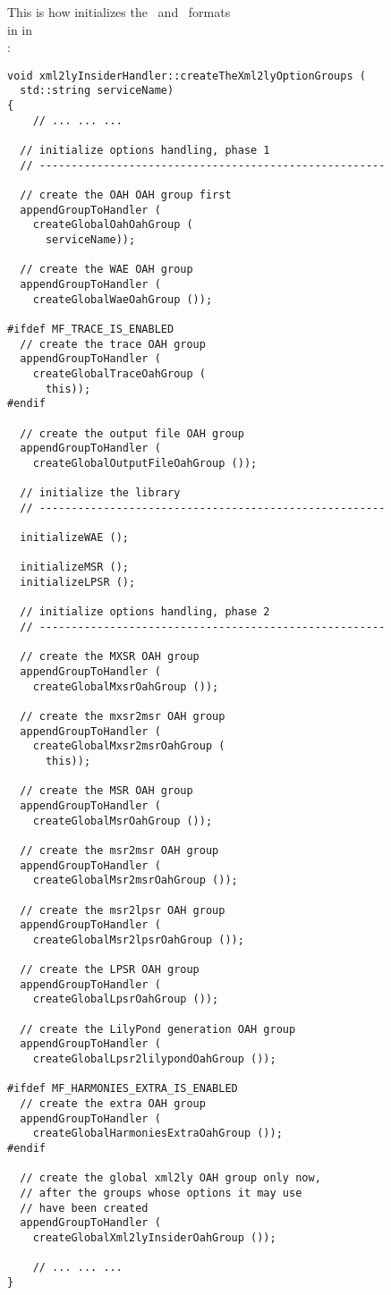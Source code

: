 This is how  initializes the \msrRepr\ and \lpsrRepr\ formats \\
in  in \\
:
\begin{lstlisting}[language=CPlusPlus]
void xml2lyInsiderHandler::createTheXml2lyOptionGroups (
  std::string serviceName)
{
	// ... ... ...

  // initialize options handling, phase 1
  // ------------------------------------------------------

  // create the OAH OAH group first
  appendGroupToHandler (
    createGlobalOahOahGroup (
      serviceName));

  // create the WAE OAH group
  appendGroupToHandler (
    createGlobalWaeOahGroup ());

#ifdef MF_TRACE_IS_ENABLED
  // create the trace OAH group
  appendGroupToHandler (
    createGlobalTraceOahGroup (
      this));
#endif

  // create the output file OAH group
  appendGroupToHandler (
    createGlobalOutputFileOahGroup ());

  // initialize the library
  // ------------------------------------------------------

  initializeWAE ();
  
  initializeMSR ();
  initializeLPSR ();

  // initialize options handling, phase 2
  // ------------------------------------------------------

  // create the MXSR OAH group
  appendGroupToHandler (
    createGlobalMxsrOahGroup ());

  // create the mxsr2msr OAH group
  appendGroupToHandler (
    createGlobalMxsr2msrOahGroup (
      this));

  // create the MSR OAH group
  appendGroupToHandler (
    createGlobalMsrOahGroup ());

  // create the msr2msr OAH group
  appendGroupToHandler (
    createGlobalMsr2msrOahGroup ());

  // create the msr2lpsr OAH group
  appendGroupToHandler (
    createGlobalMsr2lpsrOahGroup ());

  // create the LPSR OAH group
  appendGroupToHandler (
    createGlobalLpsrOahGroup ());

  // create the LilyPond generation OAH group
  appendGroupToHandler (
    createGlobalLpsr2lilypondOahGroup ());

#ifdef MF_HARMONIES_EXTRA_IS_ENABLED
  // create the extra OAH group
  appendGroupToHandler (
    createGlobalHarmoniesExtraOahGroup ());
#endif

  // create the global xml2ly OAH group only now,
  // after the groups whose options it may use
  // have been created
  appendGroupToHandler (
    createGlobalXml2lyInsiderOahGroup ());

	// ... ... ...
}
\end{lstlisting}

